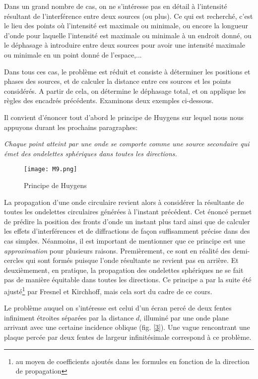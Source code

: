 Dans un grand nombre de cas, on ne s'intéresse pas en détail à l'intensité résultant de l'interférence entre deux sources (ou plus). Ce qui est recherché, c'est le lieu des points où l'intensité est maximale ou minimale, ou encore la longueur d'onde pour laquelle l'intensité est maximale ou minimale à un endroit donné, ou le déphasage à introduire entre deux sources pour avoir une intensité maximale ou minimale en un point donné de l'espace,...

Dans tous ces cas, le problème est réduit et consiste à déterminer les positions et phases des sources, et de calculer la distance entre ces sources et les points considérés. A partir de cela, on détermine le déphasage total, et on applique les règles des encadrés précédents. Examinons deux exemples ci-dessous.

Il convient d'énoncer tout d'abord le principe de Huygens sur lequel nous nous appuyons durant les prochains paragraphes:
\begin{center}
\textit{Chaque point atteint par une onde se comporte comme une source secondaire qui émet des ondelettes sphériques dans toutes les directions.}
\end{center}

\begin{figure}[htb]
\centering
\texttt{[image: M9.png]}
\caption{Principe de Huygens}
\end{figure}

La propagation d'une onde circulaire revient alors à considérer la résultante de toutes les ondelettes circulaires générées à l'instant précédent.
Cet énoncé permet de prédire la position des fronts d’onde un instant plus tard ainsi que de calculer les effets d’interférences et de diffractions de façon suffisamment précise dans des cas simples.
Néanmoins, il est important de mentionner que ce principe est une {\it approximation} pour plusieurs raisons. Premièrement, ce sont en réalité des demi-cercles qui sont formés puisque l'onde résultante ne revient pas en arrière. Et deuxièmement, en pratique, la propagation des ondelettes sphériques ne se fait pas de manière équitable dans toutes les directions. Ce principe a par la suite été ajusté\footnote{au moyen de coefficients ajoutés dans les formules en fonction de la direction de propagation} par Fresnel et Kirchhoff, mais cela sort du cadre de ce cours.

Le problème auquel on s'intéresse est celui d'un écran percé de deux fentes infiniment étroites séparées par la distance $d$, illuminé par une onde plane arrivant avec une certaine incidence oblique (fig. \ref{3}). Une vague rencontrant une plaque percée par deux fentes de largeur infinitésimale correspond à ce problème.

